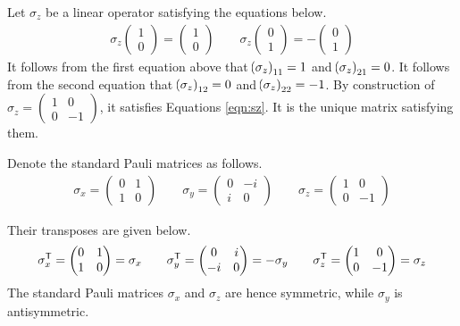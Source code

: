 \begin{answer}
	Let $\sigma_z$ be a linear operator satisfying the equations below.
	\begin{align}\label{eqn:sz}
		\sigma_z
		\begin{pmatrix}
			1 \\
			0
		\end{pmatrix}
		=
		\begin{pmatrix} 1 \\ 0 \end{pmatrix}
		\qquad
		\sigma_z
		\begin{pmatrix}
			0 \\
			1
		\end{pmatrix}
		= -
		\begin{pmatrix}
			0 \\
			1
		\end{pmatrix}
	\end{align}
	It follows from the first equation above that $\!\left(\sigma_z\right)_{11} = 1$ and $\!\left(\sigma_z\right)_{21} = 0$.
	It follows from the second equation that $\!\left(\sigma_z\right)_{12} = 0$ and $\!\left(\sigma_z\right)_{22} = -1$.
	By construction of $\sigma_z = \begin{pmatrix} 1 & 0 \\ 0 & -1 \end{pmatrix}$, it satisfies Equations \eqref{eqn:sz}.
	It is the unique matrix satisfying them.
\end{answer}

Denote the standard Pauli matrices as follows.
\begin{align}
	\sigma_x =
	\begin{pmatrix}
		0 & 1 \\
		1 & 0
	\end{pmatrix}
	\qquad \sigma_y =
	\begin{pmatrix}
		0 & -i \\
		i & 0
	\end{pmatrix}
	\qquad \sigma_z =
	\begin{pmatrix}
		1 & 0  \\
		0 & -1
	\end{pmatrix}
\end{align}

Their transposes are given below.
\begin{align*}
	\sigma_x^{\mathsf{T}} =
	\begin{pmatrix}
		0 & 1 \\
		1 & 0
	\end{pmatrix}
	= \sigma_x
	\qquad
	\sigma_y^{\mathsf{T}} =
	\begin{pmatrix}
		0  & i \\
		-i & 0
	\end{pmatrix}
	= - \sigma_y
	\qquad
	\sigma_z^{\mathsf{T}} =
	\begin{pmatrix}
		1 & 0  \\
		0 & -1
	\end{pmatrix}
	= \sigma_z
\end{align*}
The standard Pauli matrices $\sigma_x$ and $\sigma_z$ are hence symmetric, while $\sigma_y$ is antisymmetric.

